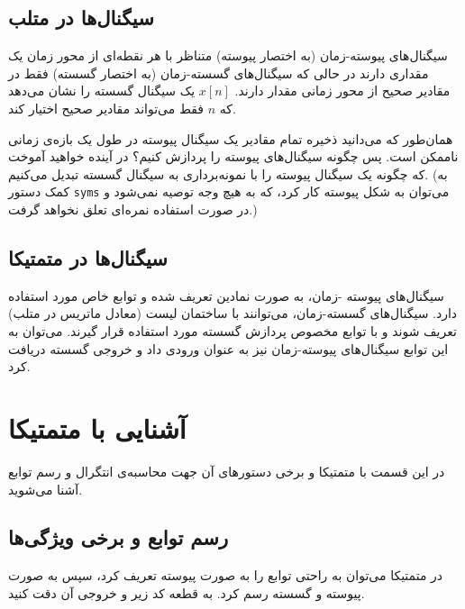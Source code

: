 \documentclass{utsignal}
\begin{document}
	\subsection{سیگنال‌ها در متلب}
	سیگنال‌های پیوسته-زمان  (به اختصار پیوسته) متناظر با هر نقطه‌ای از محور زمان یک مقداری دارند در حالی که سیگنال‌‌های گسسته-زمان (به اختصار گسسته) فقط در مقادیر صحیح از محور زمانی مقدار دارند. $x[n]$ یک سیگنال گسسته را نشان می‌دهد که $n$ فقط می‌تواند مقادیر صحیح اختیار کند.
	
	همان‌طور که می‌دانید ذخیره تمام مقادیر یک سیگنال پیوسته در طول یک بازه‌ی زمانی ناممکن است. پس چگونه سیگنال‌های پیوسته را پردازش کنیم؟ در آینده خواهید آموخت که چگونه یک سیگنال پیوسته را با نمونه‌برداری به سیگنال گسسته تبدیل می‌کنیم. (به کمک دستور \lstinline[language=Octave]{syms} می‌توان به شکل پیوسته کار کرد، که به هیچ وجه توصیه نمی‌شود و در صورت استفاده نمره‌ای تعلق نخواهد گرفت.)

	\subsection{سیگنال‌ها در متمتیکا}
	سیگنال‌های پیوسته -زمان، به صورت نمادین تعریف شده و توابع خاص مورد استفاده دارد. سیگنال‌های گسسته-زمان، می‌توانند با ساختمان لیست  (معادل ماتریس در متلب) تعریف شوند و با توابع مخصوص پردازش گسسته مورد استفاده قرار گیرند. می‌توان به این توابع سیگنال‌های پیوسته-زمان نیز به عنوان ورودی داد و خروجی گسسته دریافت کرد.
	\section{آشنایی با متمتیکا}
	در این قسمت با متمتیکا و برخی دستورهای آن جهت محاسبه‌ی انتگرال و رسم توابع آشنا می‌شوید.
	\subsection{رسم توابع و برخی ویژگی‌ها}
	در متمتیکا می‌توان به راحتی توابع را به صورت پیوسته تعریف کرد، سپس به صورت پیوسته و گسسته رسم کرد. به قطعه کد زیر و خروجی آن دقت کنید.
	\begin{latin}
		
	\end{latin}
	
\end{document}

